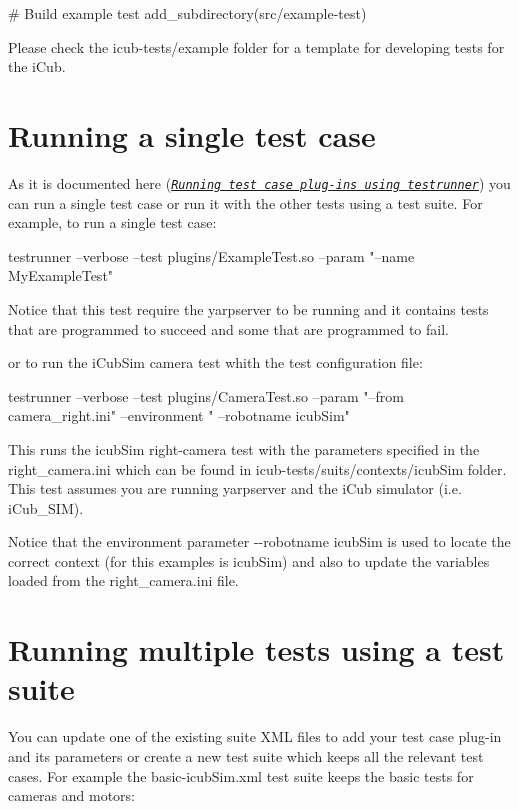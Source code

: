 \begin{DoxyCode}
\textcolor{preprocessor}{# Build example test }
\textcolor{preprocessor}{add\_subdirectory(src/example-test)}
\end{DoxyCode}


Please check the {\ttfamily icub-\/tests/example} folder for a template for developing tests for the i\+Cub.\hypertarget{writing-and-running_running_single_test_case}{}\section{Running a single test case}\label{writing-and-running_running_single_test_case}
As it is documented here (\href{http://robotology.github.io/robot-testing/documentation/testrunner.html}{\tt {\itshape Running test case plug-\/ins using testrunner}}) you can run a single test case or run it with the other tests using a test suite. For example, to run a single test case\+:


\begin{DoxyCode}
testrunner --verbose --test plugins/ExampleTest.so  --param \textcolor{stringliteral}{"--name MyExampleTest"}
\end{DoxyCode}


Notice that this test require the {\ttfamily yarpserver} to be running and it contains tests that are programmed to succeed and some that are programmed to fail.

or to run the i\+Cub\+Sim camera test whith the test configuration file\+:


\begin{DoxyCode}
testrunner --verbose --test plugins/CameraTest.so --param \textcolor{stringliteral}{"--from camera\_right.ini"} --environment \textcolor{stringliteral}{"
      --robotname icubSim"}
\end{DoxyCode}


This runs the icub\+Sim right-\/camera test with the parameters specified in the {\ttfamily right\+\_\+camera.\+ini} which can be found in {\ttfamily icub-\/tests/suits/contexts/icub\+Sim} folder. This test assumes you are running {\ttfamily yarpserver} and the i\+Cub simulator (i.\+e. {\ttfamily i\+Cub\+\_\+\+S\+IM}).

Notice that the environment parameter {\ttfamily -\/-\/robotname icub\+Sim} is used to locate the correct context (for this examples is {\ttfamily icub\+Sim}) and also to update the variables loaded from the {\ttfamily right\+\_\+camera.\+ini} file.\hypertarget{writing-and-running_running_multiple_tests}{}\section{Running multiple tests using a test suite}\label{writing-and-running_running_multiple_tests}
You can update one of the existing suite X\+ML files to add your test case plug-\/in and its parameters or create a new test suite which keeps all the relevant test cases. For example the {\ttfamily basic-\/icub\+Sim.\+xml} test suite keeps the basic tests for cameras and motors\+:


